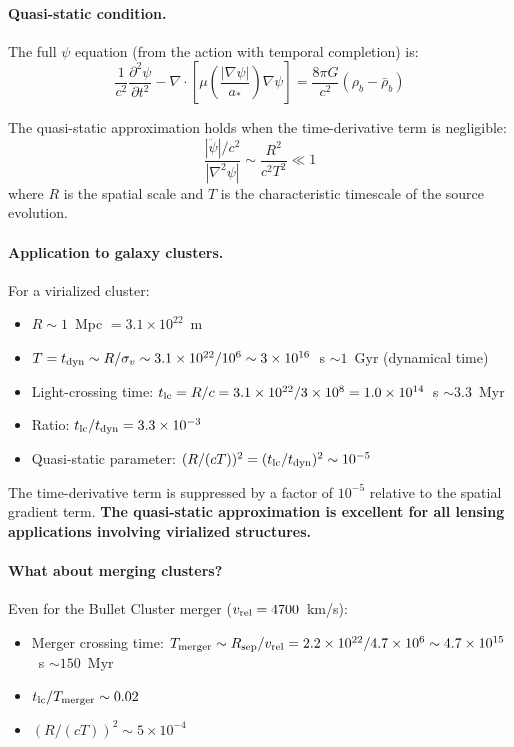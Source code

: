 \documentclass[11pt,a4paper]{article}
\newcommand{\astar}{a_*}
\begin{document}
\paragraph{Quasi-static condition.}
The full $\psi$ equation (from the action with temporal completion) is:
\begin{equation}
\frac{1}{c^2}\frac{\partial^2\psi}{\partial t^2}
- \nabla \cdot \left[\mu\!\left(\frac{|\nabla\psi|}{\astar}\right)
\nabla\psi\right] = \frac{8\pi G}{c^2}(\rho_b - \bar{\rho}_b)
\end{equation}

The quasi-static approximation holds when the time-derivative term is negligible:
\begin{equation}
\frac{|\ddot{\psi}|/c^2}{|\nabla^2\psi|} \sim \frac{R^2}{c^2 T^2} \ll 1
\end{equation}
where $R$ is the spatial scale and $T$ is the characteristic timescale of the
source evolution.

\paragraph{Application to galaxy clusters.}
For a virialized cluster:
\begin{itemize}
\item $R \sim 1$~Mpc $= 3.1 \times 10^{22}$~m
\item $T = t_{\rm dyn} \sim R/\sigma_v \sim 3.1 \times 10^{22}/10^6 \sim
  3 \times 10^{16}$~s $\sim 1$~Gyr (dynamical time)
\item Light-crossing time: $t_{\rm lc} = R/c = 3.1 \times 10^{22}/
  3 \times 10^8 = 1.0 \times 10^{14}$~s $\sim 3.3$~Myr
\item Ratio: $t_{\rm lc}/t_{\rm dyn} = 3.3 \times 10^{-3}$
\item Quasi-static parameter: $(R/(cT))^2 = (t_{\rm lc}/t_{\rm dyn})^2
  \sim 10^{-5}$
\end{itemize}

The time-derivative term is suppressed by a factor of $10^{-5}$ relative to the
spatial gradient term.  \textbf{The quasi-static approximation is excellent for
all lensing applications involving virialized structures.}

\paragraph{What about merging clusters?}
Even for the Bullet Cluster merger ($v_{\rm rel} = 4700$~km/s):
\begin{itemize}
\item Merger crossing time: $T_{\rm merger} \sim R_{\rm sep}/v_{\rm rel}
  = 2.2 \times 10^{22}/4.7 \times 10^6 \sim 4.7 \times 10^{15}$~s
  $\sim 150$~Myr
\item $t_{\rm lc}/T_{\rm merger} \sim 0.02$
\item $(R/(cT))^2 \sim 5 \times 10^{-4}$
\end{itemize}
\end{document}
